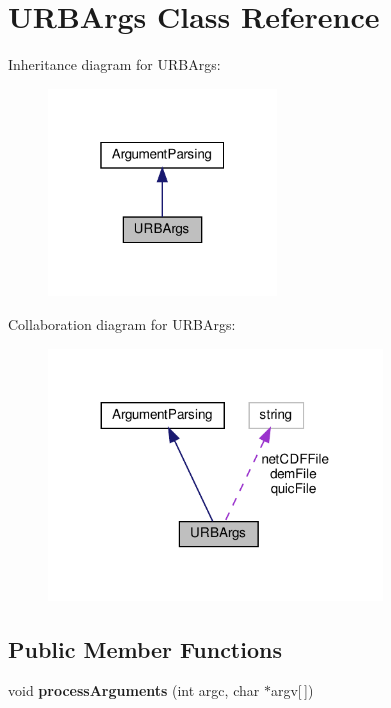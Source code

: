 \hypertarget{classURBArgs}{}\section{U\+R\+B\+Args Class Reference}
\label{classURBArgs}


Inheritance diagram for U\+R\+B\+Args\+:
\nopagebreak
\begin{figure}[H]
\begin{center}
\leavevmode
\includegraphics[width=172pt]{classURBArgs__inherit__graph}
\end{center}
\end{figure}


Collaboration diagram for U\+R\+B\+Args\+:
\nopagebreak
\begin{figure}[H]
\begin{center}
\leavevmode
\includegraphics[width=251pt]{classURBArgs__coll__graph}
\end{center}
\end{figure}
\subsection*{Public Member Functions}
\begin{DoxyCompactItemize}
\item 
\mbox{\label{classURBArgs_a28039b5ab7401450959678c0a3689906}} 
void {\bfseries process\+Arguments} (int argc, char $\ast$argv\mbox{[}$\,$\mbox{]})
\end{DoxyCompactItemize}
